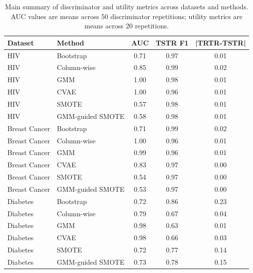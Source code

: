 \begin{table}
\caption{Main summary of discriminator and utility metrics across datasets and methods. AUC values are means across 50 discriminator repetitions; utility metrics are means across 20 repetitions.}
\label{tab:main_metrics}
\begin{tabular}{llccc}
\toprule
Dataset & Method & AUC & TSTR F1 & |TRTR-TSTR| \\
\midrule
HIV & Bootstrap & 0.71 & 0.97 & 0.01 \\
HIV & Column-wise & 0.85 & 0.99 & 0.02 \\
HIV & GMM & 1.00 & 0.98 & 0.01 \\
HIV & CVAE & 1.00 & 0.96 & 0.01 \\
HIV & SMOTE & 0.57 & 0.98 & 0.01 \\
HIV & GMM-guided SMOTE & 0.58 & 0.98 & 0.01 \\
Breast Cancer & Bootstrap & 0.71 & 0.99 & 0.02 \\
Breast Cancer & Column-wise & 1.00 & 0.96 & 0.01 \\
Breast Cancer & GMM & 0.99 & 0.96 & 0.01 \\
Breast Cancer & CVAE & 0.83 & 0.97 & 0.00 \\
Breast Cancer & SMOTE & 0.54 & 0.97 & 0.00 \\
Breast Cancer & GMM-guided SMOTE & 0.53 & 0.97 & 0.00 \\
Diabetes & Bootstrap & 0.72 & 0.86 & 0.23 \\
Diabetes & Column-wise & 0.79 & 0.67 & 0.04 \\
Diabetes & GMM & 0.98 & 0.63 & 0.01 \\
Diabetes & CVAE & 0.98 & 0.66 & 0.03 \\
Diabetes & SMOTE & 0.72 & 0.77 & 0.14 \\
Diabetes & GMM-guided SMOTE & 0.73 & 0.78 & 0.15 \\
\bottomrule
\end{tabular}
\end{table}

